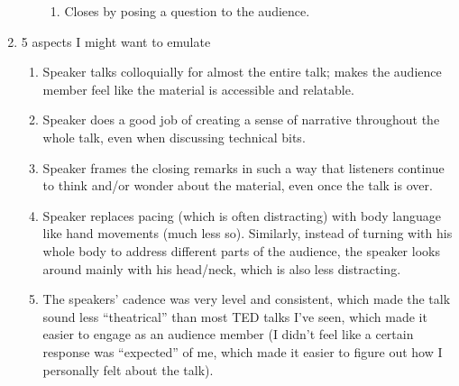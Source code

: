 \documentclass{fkpset}
\begin{document}
\begin{solution}[Answers.]
\begin{enumerate}[label=\arabic*.]
\begin{enumerate}
\begin{enumerate}[label=\roman*.]
            \item Closes by posing a question to the audience.
          \end{enumerate}
      \end{enumerate}
    \item 5 aspects I might want to emulate
      \begin{enumerate}
        \item Speaker talks colloquially for almost the entire talk; makes the
          audience member feel like the material is accessible and relatable.
        \item Speaker does a good job of creating a sense of narrative
          throughout the whole talk, even when discussing technical bits.
        \item Speaker frames the closing remarks in such a way that listeners
          continue to think and/or wonder about the material, even once the talk
          is over.
        \item Speaker replaces pacing (which is often distracting) with body
          language like hand movements (much less so). Similarly, instead of
          turning with his whole body to address different parts of the
          audience, the speaker looks around mainly with his head/neck, which is
          also less distracting.
        \item The speakers' cadence was very level and consistent, which made
          the talk sound less ``theatrical'' than most TED talks I've seen,
          which made it easier to engage as an audience member (I didn't feel
          like a certain response was ``expected'' of me, which made it easier
          to figure out how I personally felt about the talk).
      \end{enumerate}
  \end{enumerate}
\end{solution}
\end{document}
